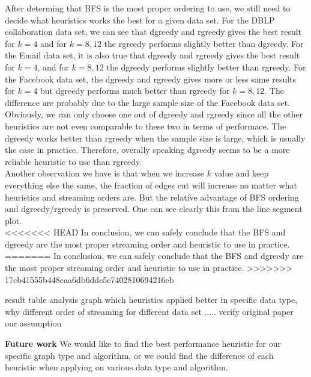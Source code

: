 \documentclass[12pt]{article}
\begin{document}
After determing that BFS is the most proper ordering to use, we still need to decide what heuristics works the best for a given data set. For the DBLP collaboration data set, we can see that dgreedy and rgreedy gives the best result for $k=4$ and for $k=8, 12$ the rgreedy performs slightly better than dgreedy. For the Email data set, it is also true that dgreedy and rgreedy gives the best result for $k=4$, and for $k=8, 12$ the dgreedy performs slightly better than rgreedy. For the Facebook data set, the dgreedy and rgreedy gives more or less same results for $k=4$ but dgreedy performs much better than rgreedy for $k=8, 12$. The difference are probably due to the large sample size of the Facebook data set. Obviously, we can only choose one out of dgreedy and rgreedy since all the other heuristics are not even comparable to these two in terms of performace. The dgreedy works better than rgreedy when the sample size is large, which is usually the case in practice. Therefore, overally speaking dgreedy seems to be a more reliable heuristic to use than rgreedy.\\

Another observation we have is that when we increase $k$ value and keep everything else the same, the fraction of edges cut will increase no matter what heuristics and streaming orders are. But the relative advantage of BFS ordering and dgreedy/rgreedy is preserved. One can see clearly this from the line segment plot. \\

<<<<<<< HEAD
In conclusion, we can safely conclude that the BFS and dgreedy are the most proper streaming order and heuristic to use in practice.
=======
In conclusion, we can safely conclude that the BFS and dgreedy are the most proper streaming order and heuristic to use in practice. 
>>>>>>> 17cb41555b448caa6db6ddc5c7402810694216eb

 result table
 analysis graph
 	which heuristics applied better in specific data type, why
	different order of streaming for different data set
	.....
verify original paper
our assumption

\textbf{Future work}
We would like to find the best performance heuristic for our specific graph type and algorithm, or we could find the difference of each heuristic when applying on various data type and algorithm.



\end{document}
